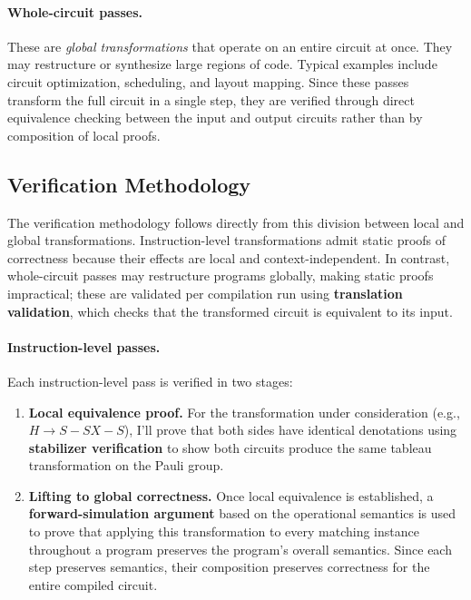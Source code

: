 \paragraph{Whole-circuit passes.}
These are \emph{global transformations} that operate on an entire circuit at once.  
They may restructure or synthesize large regions of code.  
Typical examples include circuit optimization, scheduling, and layout mapping.  
Since these passes transform the full circuit in a single step, they are verified through direct equivalence checking between the input and output circuits rather than by composition of local proofs.

\subsection{Verification Methodology}

The verification methodology follows directly from this division between local and global transformations.
Instruction-level transformations admit static proofs of correctness because their effects are local and context-independent. In contrast, whole-circuit passes may restructure programs globally, making static proofs impractical; these are validated per compilation run using \textbf{translation validation}, which checks that the transformed circuit is equivalent to its input.

\paragraph{Instruction-level passes.}
Each instruction-level pass is verified in two stages:

\begin{enumerate}
  \item \textbf{Local equivalence proof.}  
  For the transformation under consideration (e.g., \(H \rightarrow S\!-\!SX\!-\!S\)), I'll prove that both sides have identical denotations using  \textbf{stabilizer verification} to show both circuits produce the same tableau transformation on the Pauli group.

  \item \textbf{Lifting to global correctness.}  
  Once local equivalence is established, a \textbf{forward-simulation argument} based on the operational semantics is used to prove that applying this transformation to every matching instance throughout a program preserves the program’s overall semantics.  
  Since each step preserves semantics, their composition preserves correctness for the entire compiled circuit.
\end{enumerate}

